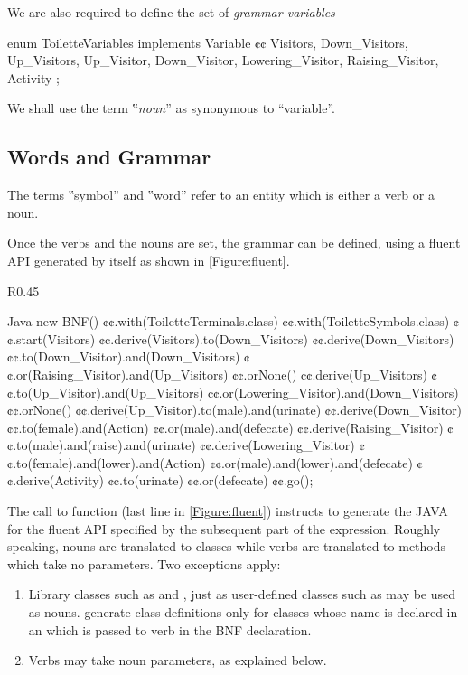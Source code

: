 We are also required to define the set of \emph{grammar variables}
\begin{JAVA}
enum ToiletteVariables implements Variable {¢¢
  Visitors, Down_Visitors, Up_Visitors,
  Up_Visitor, Down_Visitor,
  Lowering_Visitor, Raising_Visitor,
  Activity
};
\end{JAVA}
  We shall use the term ‟\emph{noun}” as synonymous to ``variable''.

\subsection{Words and Grammar}
The terms ‟symbol” and ‟word” refer to an entity which is either
  a verb or a noun.

Once the verbs and the nouns are set, the grammar can be defined,
  using a fluent API generated by \Self itself as shown
  in \cref{Figure:fluent}.

\begin{wrapfigure}R{0.45\linewidth}
  \begin{Code}{Java}
new BNF()
  ¢¢.with(ToiletteTerminals.class)
  ¢¢.with(ToiletteSymbols.class)
  ¢¢.start(Visitors)
  ¢¢.derive(Visitors).to(Down_Visitors)
  ¢¢.derive(Down_Visitors)
    ¢¢.to(Down_Visitor).and(Down_Visitors)
    ¢¢.or(Raising_Visitor).and(Up_Visitors)
    ¢¢.orNone()
  ¢¢.derive(Up_Visitors)
    ¢¢.to(Up_Visitor).and(Up_Visitors)
    ¢¢.or(Lowering_Visitor).and(Down_Visitors)
    ¢¢.orNone()
  ¢¢.derive(Up_Visitor).to(male).and(urinate)
  ¢¢.derive(Down_Visitor)
    ¢¢.to(female).and(Action)
    ¢¢.or(male).and(defecate)
  ¢¢.derive(Raising_Visitor)
    ¢¢.to(male).and(raise).and(urinate)
  ¢¢.derive(Lowering_Visitor)
    ¢¢.to(female).and(lower).and(Action)
    ¢¢.or(male).and(lower).and(defecate)
  ¢¢.derive(Activity)
    ¢¢.to(urinate)
    ¢¢.or(defecate)
  ¢¢.go();
  \end{Code}
  \caption{A BNF grammar for the toilette seat problem}
  \label{Figure:fluent}
\end{wrapfigure}

The call to function  (last line in \cref{Figure:fluent}) instructs
  \Self to generate the JAVA for the fluent API specified by the
  subsequent part of the expression.
Roughly speaking, nouns are translated to classes while verbs are translated to methods which
  take no parameters.
Two exceptions apply:
\begin{enumerate}
  \item 
    Library classes such as  and , just as user-defined
    classes such as  may be used as nouns. 
    \Self generate class definitions only for classes whose name is declared 
    in an  which is passed to  verb in the BNF declaration.
  \item Verbs may take noun parameters, as explained below.
\end{enumerate}

